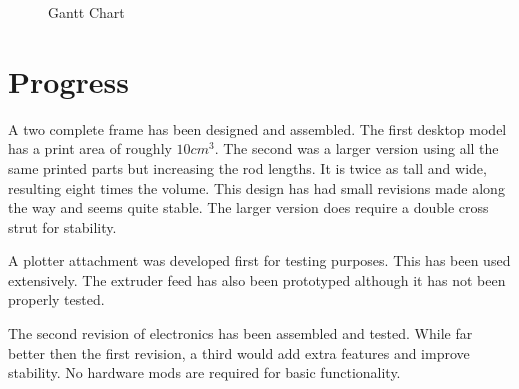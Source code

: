 \documentclass[a4paper, 11pt, twoside]{Thesis}  %
\begin{document}
\begin{figure}[p]

  \begin{gantt}{20}{12}
    \begin{ganttitle}
    \end{ganttitle}
  \end{gantt}

  \centering
  \caption{Gantt Chart}
  \label{fig:figure3}
\end{figure}

\clearpage

\section{Progress}

A two complete frame has been designed and assembled. The first desktop model has a print area of roughly $10cm^3$. The second was a larger version using all the same printed parts but increasing the rod lengths. It is twice as tall and wide, resulting eight times the volume. This design has had small revisions made along the way and seems quite stable. The larger version does require a double cross strut for stability.

A plotter attachment was developed first for testing purposes. This has been used extensively. The extruder feed has also been prototyped although it has not been properly tested.

The second revision of electronics has been assembled and tested. While far better then the first revision, a third would add extra features and improve stability. No hardware mods are required for basic functionality.
\end{document}
